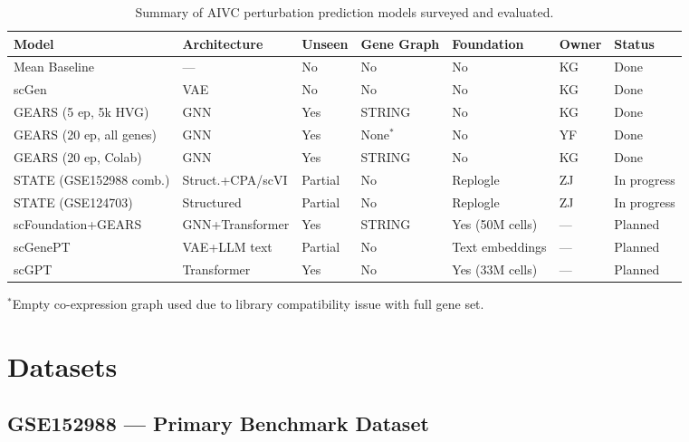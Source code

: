 \documentclass[11pt,letterpaper]{article}
\begin{document}
\begin{table}[h]
\centering
\caption{Summary of AIVC perturbation prediction models surveyed and evaluated.}
\label{tab:models}
\small
\begin{tabular}{lllllll}
\toprule
Model & Architecture & Unseen & Gene Graph & Foundation & Owner & Status \\
\midrule
Mean Baseline            & ---                   & No      & No      & No              & KG  & Done \\
scGen                    & VAE                   & No      & No      & No              & KG  & Done \\
GEARS (5 ep, 5k HVG)     & GNN                   & Yes     & STRING  & No              & KG  & Done \\
GEARS (20 ep, all genes) & GNN                   & Yes     & None$^*$& No              & YF  & Done \\
GEARS (20 ep, Colab)     & GNN                   & Yes     & STRING  & No              & KG  & Done \\
STATE (GSE152988 comb.)  & Struct.+CPA/scVI      & Partial & No      & Replogle        & ZJ  & In progress \\
STATE (GSE124703)        & Structured            & Partial & No      & Replogle        & ZJ  & In progress \\
scFoundation+GEARS       & GNN+Transformer       & Yes     & STRING  & Yes (50M cells) & --- & Planned \\
scGenePT                 & VAE+LLM text          & Partial & No      & Text embeddings & --- & Planned \\
scGPT                    & Transformer           & Yes     & No      & Yes (33M cells) & --- & Planned \\
\bottomrule
\end{tabular}
\vspace{2pt}
{\footnotesize $^*$Empty co-expression graph used due to library compatibility issue with full gene set.}
\end{table}

\section{Datasets}

\subsection{GSE152988 --- Primary Benchmark Dataset}
\end{document}
